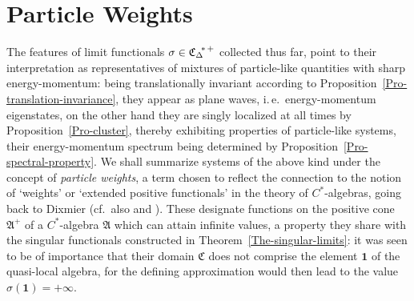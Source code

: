 \documentclass[11pt,twoside,openright]{report}
\theoremstyle{definition}
\theoremstyle{plain}
\theoremstyle{remark}
\theoremstyle{assumption}
\newcommand{\Afrak}{\mathfrak{A}}
\newcommand{\Cfrak}{\mathfrak{C}}
\newcommand{\unit}{\mathbf{1}}
\newcommand{\CDstarplus}{{\mathfrak{C}_\Delta}^{\negthickspace *
    \thinspace +}}
\begin{document}
\section{Particle Weights}
  \label{sec-particle-weights}

The features of limit functionals $\sigma \in \CDstarplus$ collected
thus far, point to their interpretation as representatives of
mixtures of particle-like quantities with sharp energy-momentum: being
translationally invariant according to
Proposition~\ref{Pro-translation-invariance}, they appear as plane
waves, i.\,e.~energy-momentum eigenstates, on the other hand they are
singly localized at all times by Proposition~\ref{Pro-cluster},
thereby exhibiting properties of particle-like systems, their
energy-momentum spectrum being determined by
Proposition~\ref{Pro-spectral-property}. We shall summarize systems of
the above kind under the concept of \emph{particle weights}, a term
chosen to reflect the connection to the notion of `weights' or
`extended positive functionals' in the theory of $C^*$-algebras, going
back to Dixmier \cite[Section~I.4.2]{dixmier:1981} (cf.~also
\cite[Section~5.1]{pedersen:1979} and \cite{pedersen:1966}). These
designate functions on the positive cone $\Afrak^+$ of a $C^*$-algebra
$\Afrak$ which can attain infinite values, a property they share with
the singular functionals constructed in
Theorem~\ref{The-singular-limits}: it was seen to be of importance
that their domain $\Cfrak$ does not comprise the element $\unit$ of
the quasi-local algebra, for the defining approximation would then
lead to the value $\sigma ( \unit ) = + \infty$.
\end{document}
